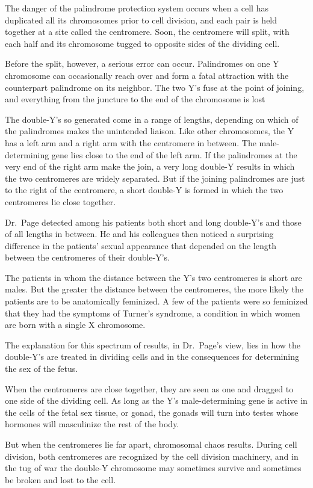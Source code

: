 ﻿\documentclass[12pt]{article}
\begin{document}
The danger of the palindrome protection system occurs when a cell has duplicated all its chromosomes
prior to cell division, and each pair is held together at a site called the centromere. Soon, the
centromere will split, with each half and its chromosome tugged to opposite sides of the dividing
cell.

Before the split, however, a serious error can occur. Palindromes on one Y chromosome can
occasionally reach over and form a fatal attraction with the counterpart palindrome on its neighbor.
The two Y's fuse at the point of joining, and everything from the juncture to the end of the
chromosome is lost

The double-Y's so generated come in a range of lengths, depending on which of the palindromes makes
the unintended liaison. Like other chromosomes, the Y has a left arm and a right arm with the
centromere in between. The male-determining gene lies close to the end of the left arm. If the
palindromes at the very end of the right arm make the join, a very long double-Y results in which
the two centromeres are widely separated. But if the joining palindromes are just to the right of
the centromere, a short double-Y is formed in which the two centromeres lie close together.

Dr.~Page detected among his patients both short and long double-Y's and those of all lengths in
between. He and his colleagues then noticed a surprising difference in the patients' sexual
appearance that depended on the length between the centromeres of their double-Y's.

The patients in whom the distance between the Y's two centromeres is short are males. But the
greater the distance between the centromeres, the more likely the patients are to be anatomically
feminized. A few of the patients were so feminized that they had the symptoms of Turner's syndrome,
a condition in which women are born with a single X chromosome.

The explanation for this spectrum of results, in Dr.~Page's view, lies in how the double-Y's are
treated in dividing cells and in the consequences for determining the sex of the fetus.

When the centromeres are close together, they are seen as one and dragged to one side of the
dividing cell. As long as the Y's male-determining gene is active in the cells of the fetal sex
tissue, or gonad, the gonads will turn into testes whose hormones will masculinize the rest of the
body.

But when the centromeres lie far apart, chromosomal chaos results. During cell division, both
centromeres are recognized by the cell division machinery, and in the tug of war the double-Y
chromosome may sometimes survive and sometimes be broken and lost to the cell.
\end{document}
